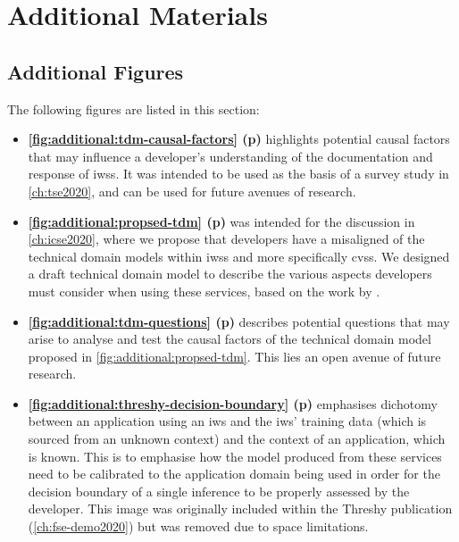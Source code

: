 \chapter{Additional Materials}
\label{ch:additional-materials}

\cleardoublepage



\clearpage

\section{Additional Figures}

The following figures are listed in this section:

\begin{itemize}[leftmargin=0mm]
\item \textbf{\cref{fig:additional:tdm-causal-factors} (p\pageref{fig:additional:tdm-causal-factors})}
  highlights potential causal factors that may influence a developer's understanding of the documentation and response of \glspl{iws}. It was intended to be used as the basis of a survey study in \cref{ch:tse2020}, and can be used for future avenues of research.
\item \textbf{\cref{fig:additional:propsed-tdm} (p\pageref{fig:additional:propsed-tdm})}
  was intended for the discussion in \cref{ch:icse2020}, where we propose that developers have a misaligned of the technical domain models within \glspl{iws} and more specifically \glspl{cvs}. We designed a draft technical domain model to describe the various aspects developers must consider when using these services, based on the work by \citet{Barnett:2018Kx}. 
\item \textbf{\cref{fig:additional:tdm-questions} (p\pageref{fig:additional:tdm-questions})}
  describes potential questions that may arise to analyse and test the causal factors of the technical domain model proposed in \cref{fig:additional:propsed-tdm}. This lies an open avenue of future research.
\item \textbf{\cref{fig:additional:threshy-decision-boundary} (p\pageref{fig:additional:threshy-decision-boundary})}
  emphasises dichotomy between an application using an \gls{iws} and the \gls{iws}' training data (which is sourced from an unknown context) and the context of an application, which is known. This is to emphasise how the model produced from these services need to be calibrated to the application domain being used in order for the decision boundary of a single inference to be properly assessed by the developer. This image was originally included within the Threshy publication (\cref{ch:fse-demo2020}) but was removed due to space limitations.

\end{itemize}
